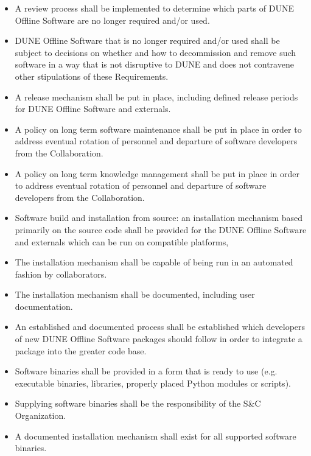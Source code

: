 \begin{itemize}
\item A review process shall be implemented to determine which parts of DUNE Offline Software are no longer required and/or used.

\item DUNE Offline Software that is no longer required and/or used shall be subject to decisions on whether and how to decommission and remove such software in a way that is not disruptive to DUNE and does not contravene other stipulations of these Requirements.

\item A release mechanism shall be put in place, including defined release periods for DUNE Offline Software and externals.

\item A policy on long term software maintenance shall be put in place in order to address eventual rotation of personnel and departure of software developers from the Collaboration.

\item A policy on long term knowledge management shall be put in place in order to address eventual rotation of personnel and departure of software developers from the Collaboration.

\item Software build and installation from source: an installation mechanism based primarily on the source code shall be provided for the DUNE Offline Software and externals which can be run on compatible platforms, 

\item The installation mechanism shall be capable of being run in an automated fashion by collaborators.

\item The installation mechanism shall be documented, including user documentation.

\item An established and documented process shall be established which developers of new DUNE Offline Software packages should follow in order to integrate a package into the greater code base.

\item Software binaries shall be provided in a form that is ready to use (e.g. executable binaries, libraries, properly placed Python modules or scripts).

\item Supplying software binaries shall be the responsibility of the S\&C Organization.

\item A documented installation mechanism shall exist for all supported software binaries.
\end{itemize}


